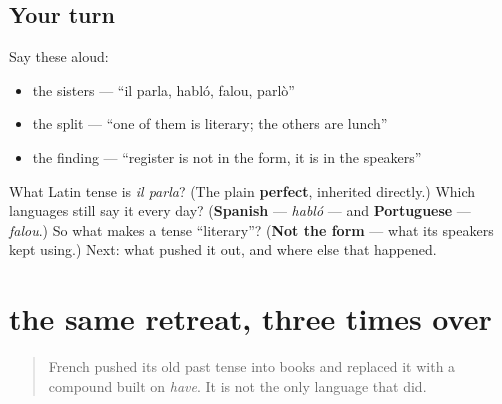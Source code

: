 \subsection*{Your turn}
Say these aloud:

\begin{itemize}
\raggedright
  \item the sisters — \textquotedblleft{}il parla, habló, falou, parlò\textquotedblright{}
  \item the split — \textquotedblleft{}one of them is literary; the others are lunch\textquotedblright{}
  \item the finding — \textquotedblleft{}register is not in the form, it is in the speakers\textquotedblright{}
\end{itemize}

\begin{tcolorbox}[breakable,colback=teal!4,colframe=teal!35!black,title={Before you move on}]
What Latin tense is \emph{il parla}? (The plain \textbf{perfect}, inherited directly.) Which languages still say it every day? (\textbf{Spanish} — \emph{habló} — and \textbf{Portuguese} — \emph{falou}.) So what makes a tense \textquotedblleft{}literary\textquotedblright{}? (\textbf{Not the form} — what its speakers kept using.) Next: what pushed it out, and where else that happened.
\end{tcolorbox}
\section[passé simple · Präteritum · passato …]{the same retreat, three times over}

\label{lesson:FR-C15-areal}



\begin{quote}
French pushed its old past tense into books and replaced it with a compound built on \emph{have}. It is not the only language that did.
\end{quote}

